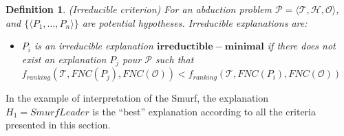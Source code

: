 \documentclass{article}
\newtheorem{mydef}{Definition}
\begin{document}
% 
% 


\begin{mydef}{(Irreducible criterion)}
For an abduction problem $\mathcal{P}=\langle \mathcal{T},\mathcal{H}, \mathcal{O}\rangle$, and $\{\langle P_{1},\dots,P_{n}\rangle\}$ are potential hypotheses. 
Irreducible explanations are:
\begin{itemize}
\item  $P_{i}$ is an irreducible explanation $\bm{irreductible-minimal}$ if there does not exist an explanation $P_{j}$ pour $\mathcal{P}$ such that $f_{ranking}(\mathcal{T},FNC(P_{j}),FNC(\mathcal{O})) 
< f_{ranking}(\mathcal{T},FNC(P_{i}),FNC(\mathcal{O}))$
\end{itemize}
\end{mydef}
In the example of interpretation of the Smurf, the explanation $H_1=SmurfLeader$ is the ``best'' explanation according to all the criteria presented
in this section.
\end{document}
